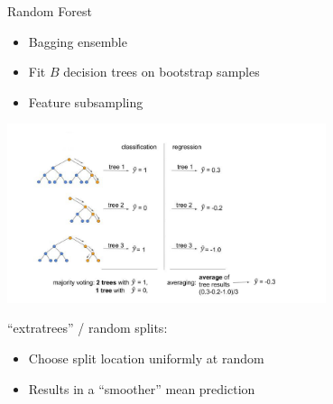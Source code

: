 \documentclass[11pt,compress,t,notes=noshow, xcolor=table]{beamer}
\begin{document}
\begin{frame}{Random Forest}

\begin{itemize}
    \item Bagging ensemble
    \item Fit $B$ decision trees on bootstrap samples
    \item Feature subsampling
\end{itemize}

\begin{center}
  \includegraphics[width = 0.7\textwidth]{slides/010-bayesian-optimization/figure_man/random_forests.jpg}
\end{center}

\enquote{extratrees} / random splits:\\
\begin{itemize}
  \item Choose split location uniformly at random
  \item Results in a \enquote{smoother} mean prediction
\end{itemize}

\end{frame}
\end{document}
